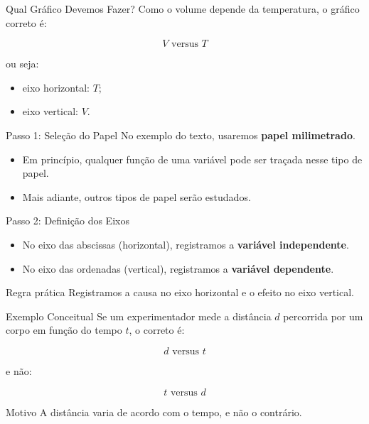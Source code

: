 \documentclass[aspectratio=169]{beamer}
\begin{document}
\begin{frame}{Qual Gráfico Devemos Fazer?}
Como o volume depende da temperatura, o gráfico correto é:

\begin{equation}
V \text{ versus } T
\end{equation}

ou seja:

\begin{itemize}
\item eixo horizontal: \(T\);
\item eixo vertical: \(V\).
\end{itemize}
\end{frame}

\begin{frame}{Passo 1: Seleção do Papel}
No exemplo do texto, usaremos \textbf{papel milimetrado}.

\begin{itemize}
\item Em princípio, qualquer função de uma variável pode ser traçada nesse tipo de papel.
\item Mais adiante, outros tipos de papel serão estudados.
\end{itemize}
\end{frame}

\begin{frame}{Passo 2: Definição dos Eixos}
\begin{itemize}
\item No eixo das abscissas (horizontal), registramos a \textbf{variável independente}.
\item No eixo das ordenadas (vertical), registramos a \textbf{variável dependente}.
\end{itemize}

\begin{block}{Regra prática}
Registramos a causa no eixo horizontal e o efeito no eixo vertical.
\end{block}
\end{frame}

\begin{frame}{Exemplo Conceitual}
Se um experimentador mede a distância \(d\) percorrida por um corpo em função do tempo \(t\), o correto é:

\begin{equation}
d \text{ versus } t
\end{equation}

e não:

\begin{equation}
t \text{ versus } d
\end{equation}

\begin{alertblock}{Motivo}
A distância varia de acordo com o tempo, e não o contrário.
\end{alertblock}
\end{frame}
\end{document}

